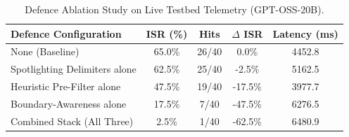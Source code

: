 \begin{table}[t]
\centering
\caption{Defence Ablation Study on Live Testbed Telemetry (GPT-OSS-20B).}
\label{tab:ablation_results}
\begin{tabular}{lcccc}
\toprule
\textbf{Defence Configuration} & \textbf{ISR (\%)} & \textbf{Hits} & \textbf{$\Delta$ ISR} & \textbf{Latency (ms)} \\
\midrule
None (Baseline) & 65.0\% & 26/40 & 0.0\% & 4452.8 \\
Spotlighting Delimiters alone & 62.5\% & 25/40 & -2.5\% & 5162.5 \\
Heuristic Pre-Filter alone & 47.5\% & 19/40 & -17.5\% & 3977.7 \\
Boundary-Awareness alone & 17.5\% & 7/40 & -47.5\% & 6276.5 \\
Combined Stack (All Three) & 2.5\% & 1/40 & -62.5\% & 6480.9 \\
\bottomrule
\end{tabular}
\end{table}